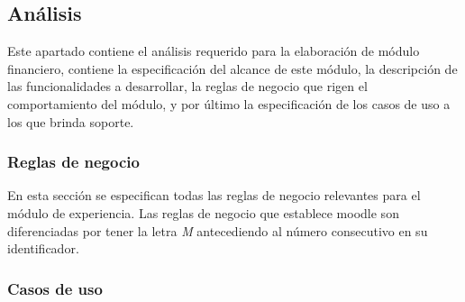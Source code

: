 
\subsection{Análisis}

 Este apartado contiene el análisis requerido para la elaboración de módulo financiero,
 contiene la especificación del alcance de este módulo, la descripción de las funcionalidades
 a desarrollar, la reglas de negocio que rigen el comportamiento del módulo, y por último la
 especificación de los casos de uso a los que brinda soporte.


\subsubsection{Reglas de negocio} %

 En esta sección se especifican todas las reglas de negocio relevantes para el módulo de
 experiencia. Las reglas de negocio que establece moodle son diferenciadas por tener la letra {\it M}
 antecediendo al número consecutivo en su identificador.



\clearpage
\subsubsection{Casos de uso} %

